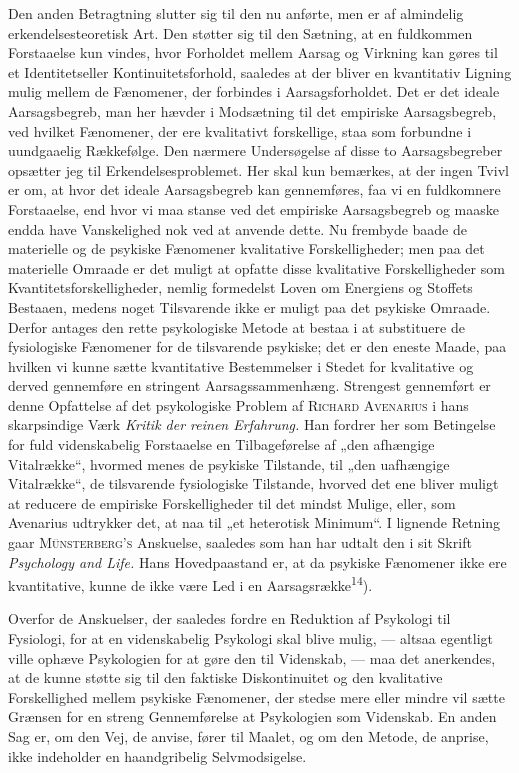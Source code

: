 \documentclass[12pt,a4paper,openany]{book}
\newcommand{\opage}[1]{\marginnote{\footnotesize\textit{[#1]}}}
\begin{document}
Den anden Betragtning slutter sig til den nu anførte, men er af almindelig
erkendelsesteoretisk Art. Den støtter sig til den Sætning, at en fuldkommen
Forstaaelse kun vindes, hvor Forholdet mellem Aarsag og Virkning kan gøres til
et Identitetseller Kontinuitetsforhold, saaledes at der bliver en kvantitativ
Ligning mulig mellem de Fænomener, der forbindes i Aarsagsforholdet. Det er det
ideale Aarsagsbegreb, man her hævder i
\opage{15}Modsætning til det empiriske Aarsagsbegreb, ved hvilket Fænomener,
der ere kvalitativt forskellige, staa som forbundne i uundgaaelig Rækkefølge.
Den nærmere Undersøgelse af disse to Aarsagsbegreber opsætter jeg til
Erkendelsesproblemet. Her skal kun bemærkes, at der ingen Tvivl er om, at hvor
det ideale Aarsagsbegreb kan gennemføres, faa vi en fuldkomnere Forstaaelse,
end hvor vi maa stanse ved det empiriske Aarsagsbegreb og maaske endda have
Vanskelighed nok ved at anvende dette. Nu frembyde baade de materielle og de
psykiske Fænomener kvalitative Forskelligheder; men paa det materielle Omraade
er det muligt at opfatte disse kvalitative Forskelligheder som
Kvantitetsforskelligheder, nemlig formedelst Loven om Energiens og Stoffets
Bestaaen, medens noget Tilsvarende ikke er muligt paa det psykiske Omraade.
Derfor antages den rette psykologiske Metode at bestaa i at substituere de
fysiologiske Fænomener for de tilsvarende psykiske; det er den eneste Maade,
paa hvilken vi kunne sætte kvantitative Bestemmelser i Stedet for kvalitative
og derved gennemføre en stringent Aarsagssammenhæng. Strengest gennemført er
denne Opfattelse af det psykologiske Problem af \textsc{Richard Avenarius} i
hans skarpsindige Værk \textit{Kritik der reinen Erfahrung.} Han fordrer her
som Betingelse for fuld videnskabelig Forstaaelse en Tilbageførelse af „den
afhængige Vitalrække“, hvormed menes de psykiske Tilstande, til „den uafhængige
Vitalrække“, de tilsvarende fysiologiske Tilstande, hvorved det ene bliver
muligt at reducere de empiriske Forskelligheder til det mindst Mulige, eller,
som Avenarius udtrykker det, at naa til „et heterotisk Minimum“. I lignende
Retning gaar \textsc{Münsterberg's} Anskuelse, saaledes som han har udtalt den
i sit Skrift \textit{Psychology and Life.} Hans Hovedpaastand er, at da
psykiske Fænomener ikke ere kvantitative, kunne de ikke være Led i en
Aarsagsrække\textsuperscript{14}).

Overfor de Anskuelser, der saaledes fordre en Reduktion af Psykologi til
Fysiologi, for at en videnskabelig Psykologi skal blive mulig, --- altsaa
egentligt ville ophæve Psykologien for at gøre den til Videnskab, --- maa det
anerkendes, at de kunne støtte sig til den faktiske Diskontinuitet og den
kvalitative Forskellighed mellem psykiske Fænomener, der stedse mere
\opage{16}eller mindre vil sætte Grænsen for en streng Gennemførelse at
Psykologien som Videnskab. En anden Sag er, om den Vej, de anvise, fører til
Maalet, og om den Metode, de anprise, ikke indeholder en haandgribelig
Selvmodsigelse.
\end{document}
